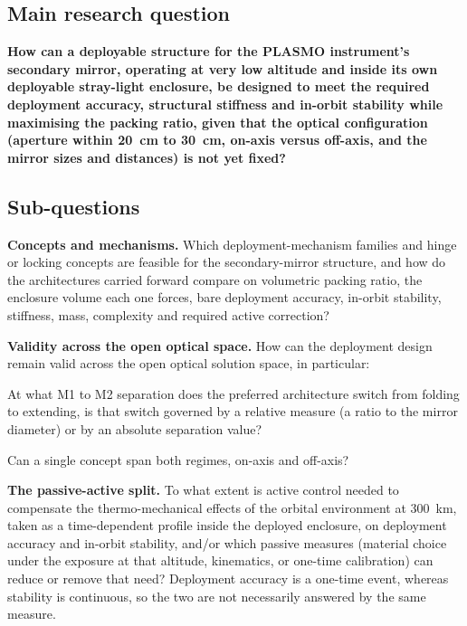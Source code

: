 \subsection*{Main research question}

\begin{mainquestion}
    \item \label{rq:main} \textbf{How can a deployable structure for the PLASMO instrument's secondary mirror, operating at very low altitude and inside its own deployable stray-light enclosure, be designed to meet the required deployment accuracy, structural stiffness and in-orbit stability while maximising the packing ratio, given that the optical configuration (aperture within \SI{20}{\centi\meter} to \SI{30}{\centi\meter}, on-axis versus off-axis, and the mirror sizes and distances) is not yet fixed?}
\end{mainquestion}

\subsection*{Sub-questions}

\begin{researchquestions}
    \item \label{rq:concepts} \textbf{Concepts and mechanisms.} Which deployment-mechanism families and hinge or locking concepts are feasible for the secondary-mirror structure, and how do the architectures carried forward compare on volumetric packing ratio, the enclosure volume each one forces, bare deployment accuracy, in-orbit stability, stiffness, mass, complexity and required active correction?
    \item \label{rq:validity} \textbf{Validity across the open optical space.} How can the deployment design remain valid across the open optical solution space, in particular:
    \begin{researchquestions}
        \item \label{rq:switch} At what M1 to M2 separation does the preferred architecture switch from folding to extending, is that switch governed by a relative measure (a ratio to the mirror diameter) or by an absolute separation value?
        \item \label{rq:axis} Can a single concept span both regimes, on-axis and off-axis?
    \end{researchquestions}
    \item \label{rq:passive} \textbf{The passive-active split.} To what extent is active control needed to compensate the thermo-mechanical effects of the orbital environment at \SI{300}{\kilo\meter}, taken as a time-dependent profile inside the deployed enclosure, on deployment accuracy and in-orbit stability, and\slash or which passive measures (material choice under the exposure at that altitude, kinematics, or one-time calibration) can reduce or remove that need? Deployment accuracy is a one-time event, whereas stability is continuous, so the two are not necessarily answered by the same measure.
\end{researchquestions}